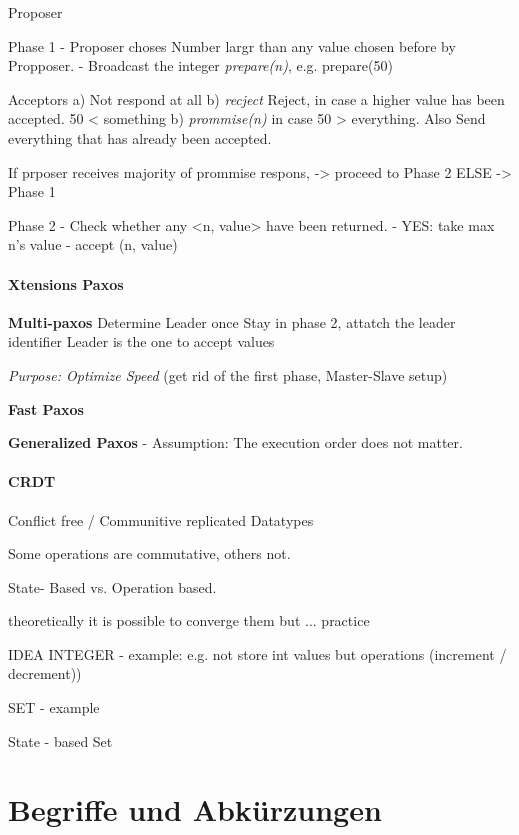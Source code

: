 \documentclass[a4paper,12pt]{article}%
\begin{document}
Proposer


Phase 1
- Proposer choses Number largr than any value chosen before by Propposer. 
- Broadcast the integer {\it prepare(n)}, e.g. prepare(50)

Acceptors
a) Not respond at all
b) {\it recject} Reject, in case a higher value has been accepted. 50 < something
b) {\it prommise(n)} in case 50 > everything. Also Send everything that has already been accepted.

If prposer receives majority of prommise respons, -> proceed to Phase 2 ELSE -> Phase 1

Phase 2
- Check whether any <n, value> have been returned. 
- YES: take max n's value
- accept (n, value)

\paragraph{Xtensions Paxos}
	
	{\bf Multi-paxos}
	Determine Leader once
	Stay in phase 2, attatch the leader identifier
	Leader is the one to accept values
	
	{\it Purpose:  Optimize Speed} (get rid of the first phase, Master-Slave setup)
	
	
	{\bf Fast Paxos}
	
	{\bf Generalized Paxos}
	- Assumption: The execution order does not matter.

\paragraph{CRDT}
Conflict free / Communitive replicated Datatypes

Some operations are commutative, others not.

State- Based vs. Operation based.

theoretically it is possible to converge them but ... practice




IDEA
INTEGER  - example: 
e.g. not store int values but operations (increment / decrement))

SET - example

State - based Set


\section{Begriffe und Abkürzungen}
\end{document}
